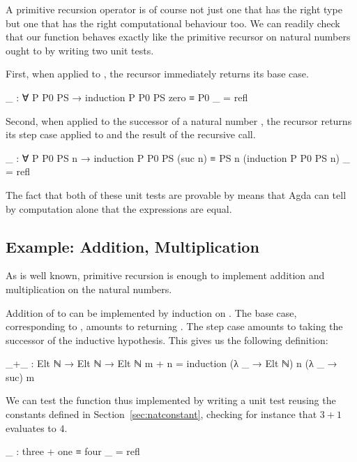 \documentclass[twocolumn]{article}
\begin{document}
A primitive recursion operator is of course not just one that has
the right type but one that has the right computational behaviour too.
We can readily check that our  function behaves exactly
like the primitive recursor on natural numbers ought to by writing two
unit tests.

First, when applied to , the recursor immediately returns
its base case.

\begin{code}
_ : ∀ {P P0 PS} → induction P P0 PS zero ≡ P0
_ = refl
\end{code}

Second, when applied to the successor of a natural number , the
recursor returns its step case applied to  and the result of the
recursive call.

\begin{code}
_ : ∀ {P P0 PS n} →
    induction P P0 PS (suc n)
    ≡ PS n (induction P P0 PS n)
_ = refl
\end{code}

The fact that both of these unit tests are provable by  means
that Agda can tell by computation alone that the expressions are equal.

\subsection{Example: Addition, Multiplication}

As is well known, primitive recursion is enough to implement addition and
multiplication on the natural numbers.

Addition of  to  can be implemented by induction on .
The base case, corresponding to  \AF{+} , amounts to returning
. The step case amounts to taking the successor of the inductive
hypothesis. This gives us the following definition:

\begin{code}
_+_ : Elt ℕ → Elt ℕ → Elt ℕ
m + n = induction (λ _ → Elt ℕ) n (λ _ → suc) m
\end{code}

We can test the function thus implemented by writing a unit test reusing
the constants defined in Section~\ref{sec:natconstant}, checking for instance
that $3+1$ evaluates to $4$.

\begin{code}
_ : three + one ≡ four
_ = refl
\end{code}
\end{document}
